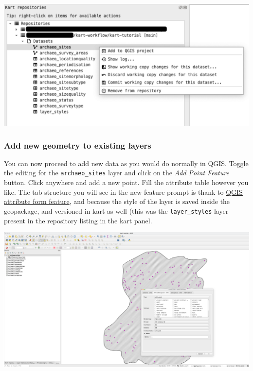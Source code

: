 \documentclass[
  letterpaper,
  DIV=11,
  numbers=noendperiod]{scrartcl}
\begin{document}
\begin{center}
\includegraphics{img/kart-panel-add-project.png}
\end{center}

\subsubsection{Add new geometry to existing layers}\label{sec-add-geom}

You can now proceed to add new data as you would do normally in QGIS.
Toggle the editing for the \texttt{archaeo\_sites} layer and click on
the \emph{Add Point Feature} button. Click anywhere and add a new point.
Fill the attribute table however you like. The tab structure you will
see in the new feature prompt is thank to
\href{https://docs.qgis.org/3.34/en/docs/user_manual/working_with_vector/vector_properties.html\#attributes-form-properties}{QGIS
attribute form feature}, and because the style of the layer is saved
inside the geopackage, and versioned in kart as well (this was the
\texttt{layer\_styles} layer present in the repository listing in the
kart panel.

\begin{center}
\includegraphics{img/qgis-add-new-feature.png}
\end{center}
\end{document}
